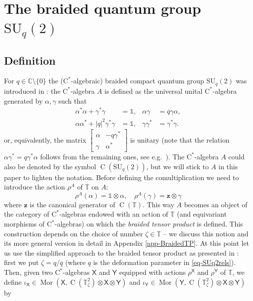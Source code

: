 \documentclass[12pt,reqno,a4paper]{amsart}
\theoremstyle{definition}
\newcommand{\cst}{\ensuremath{\mathrm{C}^*}}
\newcommand{\I}{\mathds{1}}
\newcommand{\tens}{\otimes}
\newcommand{\CC}{\mathbb{C}}
\newcommand{\TT}{\mathbb{T}}
\newcommand{\sX}{\mathsf{X}}
\newcommand{\sY}{\mathsf{Y}}
\newcommand{\bz}{{\boldsymbol{z}}}
\DeclareMathOperator{\C}{C}
\DeclareMathOperator{\Mor}{Mor}
\newcommand{\SU}{\mathrm{SU}}
\numberwithin{equation}{section}
\begin{document}
\section{The braided quantum group \texorpdfstring{$\SU_q(2)$}{SUq(2)}}\label{sect-SUq2}

\subsection{Definition}%
For $q\in\CC\setminus\{0\}$ the (\cst-algebraic) braided compact quantum group $\SU_q(2)$ was introduced in \cite{BraidedSU2}: the \cst-algebra $A$ is defined as the universal unital \cst-algebra generated by $\alpha,\gamma$ such that
\begin{equation}\label{eq-SUq2rels}
\begin{aligned}
\alpha^*\alpha+\gamma^*\gamma&=\I,&\alpha\gamma&=\overline{q}\gamma\alpha,\\
\alpha\alpha^*+|q|^2\gamma^*\gamma&=\I,&\gamma\gamma^*&=\gamma^*\gamma.
\end{aligned}
\end{equation}
or, equivalently, the matrix $\left[\begin{smallmatrix}\alpha&-q\gamma^*\\\gamma&\alpha^*\end{smallmatrix}\right]$ is unitary (note that the relation $\alpha\gamma^*=q\gamma^*\alpha$ follows from the remaining ones, see e.g.~\cite[Remark 3.1]{BraidedPodlesSpheres}). The \cst-algebra $A$ could also be denoted by the symbol $\C(\SU_q(2))$, but we will stick to $A$ in this paper to lighten the notation. Before defining the comultiplication we need to introduce the action $\rho^A$ of $\TT$ on $A$:
\begin{equation}\label{eq-eq5}
\rho^A(\alpha)=\I\tens\alpha,\quad
\rho^A(\gamma)=\bz\tens\gamma
\end{equation}
where $\bz$ is the canonical generator of $\C(\TT)$. This way $A$ becomes an object of the category of \cst-algebras endowed with an action of $\TT$ (and equivariant morphisms of \cst-algebras) on which the \emph{braided tensor product} is defined. This construction depends on the choice of number $\zeta\in \TT$ -- we discuss this notion and its more general version in detail in Appendix \ref{app-BraidedTP}. At this point let us use the simplified approach to the braided tensor product as presented in \cite[Section 1]{BraidedSU2}: first we put $\zeta=q/\overline{q}$ (where $q$ is the deformation parameter in \eqref{eq-SUq2rels}). Then, given two \cst-algebras $\sX$ and $\sY$ equipped with actions $\rho^\sX$ and $\rho^\sY$ of $\TT$, we define $\iota_{\sX}\in\Mor(\sX,\C(\TT^2_\zeta)\tens\sX\tens\sY)$ and $\iota_{\sY}\in\Mor(\sY,\C(\TT^2_\zeta)\tens\sX\tens\sY)$ by
\end{document}
